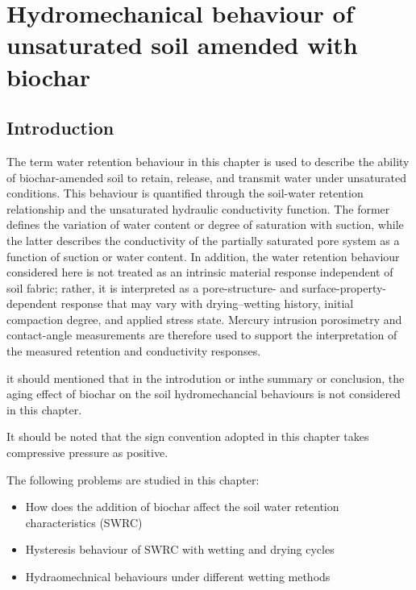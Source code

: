 \chapter{Hydromechanical behaviour of unsaturated soil amended with biochar}
\label{chap:three}

\section{Introduction}
The term water retention behaviour in this chapter is used to describe the ability of biochar-amended soil to retain, release, and transmit water under unsaturated conditions. This behaviour is quantified through the soil-water retention relationship and the unsaturated hydraulic conductivity function. The former defines the variation of water content or degree of saturation with suction, while the latter describes the conductivity of the partially saturated pore system as a function of suction or water content. In addition, the water retention behaviour considered here is not treated as an intrinsic material response independent of soil fabric; rather, it is interpreted as a pore-structure- and surface-property-dependent response that may vary with drying–wetting history, initial compaction degree, and applied stress state. Mercury intrusion porosimetry and contact-angle measurements are therefore used to support the interpretation of the measured retention and conductivity responses. \par%

it should mentioned that in the introdution or inthe summary or conclusion, the aging effect of biochar on the soil hydromechancial behaviours is not considered in this chapter. \par %

It should be noted that the sign convention adopted in this chapter takes compressive pressure as positive.\par

The following problems are studied in this chapter:
\begin{itemize}
    \item How does the addition of biochar affect the soil water retention characteristics (SWRC)
    \item Hysteresis behaviour of SWRC with wetting and drying cycles
    \item Hydraomechnical behaviours under different wetting methods
\end{itemize} 

